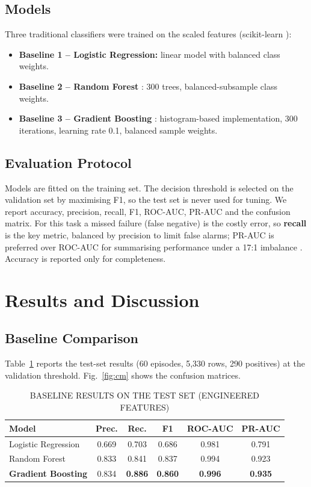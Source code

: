 \documentclass[conference]{IEEEtran}
\begin{document}
\subsection{Models}
Three traditional classifiers were trained on the scaled features (scikit-learn
\cite{pedregosa2011}):
\begin{itemize}
\item \textbf{Baseline 1 -- Logistic Regression:} linear model with balanced class weights.
\item \textbf{Baseline 2 -- Random Forest} \cite{breiman2001}: 300 trees, balanced-subsample class weights.
\item \textbf{Baseline 3 -- Gradient Boosting} \cite{friedman2001}: histogram-based implementation, 300 iterations, learning rate 0.1, balanced sample weights.
\end{itemize}

\subsection{Evaluation Protocol}
Models are fitted on the training set. The decision threshold is selected on the validation
set by maximising F1, so the test set is never used for tuning. We report accuracy,
precision, recall, F1, ROC-AUC, PR-AUC and the confusion matrix. For this task a missed
failure (false negative) is the costly error, so \textbf{recall} is the key metric, balanced
by precision to limit false alarms; PR-AUC is preferred over ROC-AUC for summarising
performance under a 17:1 imbalance \cite{saito2015}. Accuracy is reported only for completeness.

\section{Results and Discussion}

\subsection{Baseline Comparison}
Table~\ref{tab:results} reports the test-set results (60 episodes, 5,330 rows, 290 positives)
at the validation threshold. Fig.~\ref{fig:cm} shows the confusion matrices.

\begin{table}[t]
\caption{BASELINE RESULTS ON THE TEST SET (ENGINEERED FEATURES)}
\label{tab:results}
\centering
\begin{tabular}{|l|c|c|c|c|c|}
\hline
\textbf{Model} & \textbf{Prec.} & \textbf{Rec.} & \textbf{F1} & \textbf{ROC-AUC} & \textbf{PR-AUC} \\ \hline
Logistic Regression & 0.669 & 0.703 & 0.686 & 0.981 & 0.791 \\ \hline
Random Forest & 0.833 & 0.841 & 0.837 & 0.994 & 0.923 \\ \hline
\textbf{Gradient Boosting} & 0.834 & \textbf{0.886} & \textbf{0.860} & \textbf{0.996} & \textbf{0.935} \\ \hline
\end{tabular}
\end{table}
\end{document}

